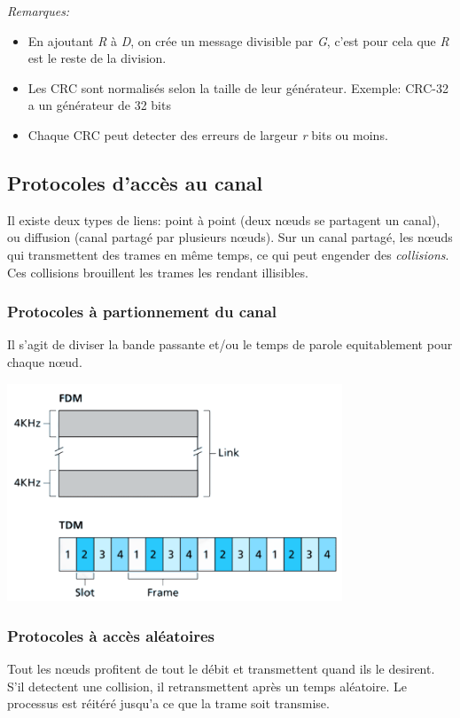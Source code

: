 \documentclass[a4paper, 12pt, french]{article}
\begin{document}
	\emph{Remarques:}
	\begin{itemize}
		\item En ajoutant \emph{R} à \emph{D}, on crée un message divisible par \emph{G}, c'est pour cela que \emph{R} est le reste de la division.
		\item Les CRC sont normalisés selon la taille de leur générateur. Exemple: CRC-32 a un générateur de 32 bits
		\item Chaque CRC peut detecter des erreurs de largeur \emph{r} bits ou moins.
	\end{itemize}

	\subsection{Protocoles d'accès au canal}

	Il existe deux types de liens: point à point (deux nœuds se partagent un canal), ou diffusion (canal partagé par plusieurs nœuds). Sur un canal partagé, les nœuds qui transmettent des trames en même temps, ce qui peut engender des \emph{collisions}. Ces collisions brouillent les trames les rendant illisibles.

	\subsubsection{Protocoles à partionnement du canal}

	Il s'agit de diviser la bande passante et/ou le temps de parole equitablement pour chaque nœud.

	\includegraphics[width=10cm]{reseau_partitionnement_canal}

	\subsubsection{Protocoles à accès aléatoires}

	Tout les nœuds profitent de tout le débit et transmettent quand ils le desirent. S'il detectent une collision, il retransmettent après un temps aléatoire. Le processus est réitéré jusqu'a ce que la trame soit transmise.
\end{document}
